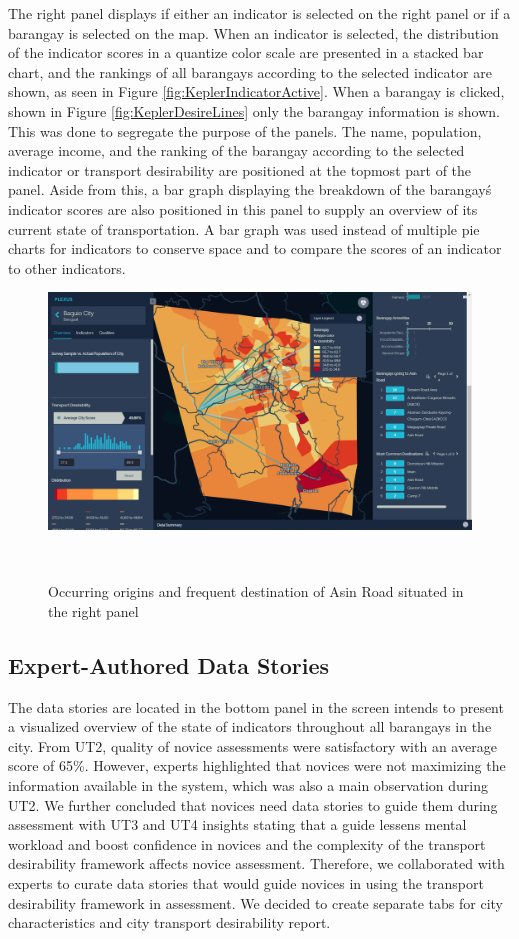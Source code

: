 \documentclass{sigchi}
\begin{document}
The right panel displays if either an indicator is selected on the right panel or if a barangay is selected on the map. When an indicator is selected, the distribution of the indicator scores in a quantize color scale are presented in a stacked bar chart, and the rankings of all barangays according to the selected indicator are shown, as seen in Figure \ref{fig:KeplerIndicatorActive}. When a barangay is clicked, shown in Figure \ref{fig:KeplerDesireLines} only the barangay information is shown. This was done to segregate the purpose of the panels. The name, population, average income, and the ranking of the barangay according to the selected indicator or transport desirability are positioned at the topmost part of the panel. Aside from this, a bar graph displaying the breakdown of the barangay\'s indicator scores are also positioned in this panel to supply an overview of its current state of transportation. A bar graph was used instead of multiple pie charts for indicators to conserve space and to compare the scores of an indicator to other indicators.


\begin{figure}
\centering
  \includegraphics[width=0.9\columnwidth]{figures/overview-barangay-2.PNG}
  \caption{Occurring origins and frequent destination of Asin Road situated in the right panel}~\label{fig:KeplerBarangayContd}
\end{figure}

\subsection{Expert-Authored Data Stories}
The data stories are located in the bottom panel in the screen intends to present a visualized overview of the state of indicators throughout all barangays in the city. From UT2, quality of novice assessments were satisfactory with an average score of 65\%. However, experts highlighted that novices were not maximizing the information available in the system, which was also a main observation during UT2. We further concluded that novices need data stories to guide them during assessment with UT3 and UT4 insights stating that a guide lessens mental workload and boost confidence in novices and the complexity of the transport desirability framework affects novice assessment. Therefore, we collaborated with experts to curate data stories that would guide novices in using the transport desirability framework in assessment. We decided to create separate tabs for city characteristics and city transport desirability report. 
\end{document}
